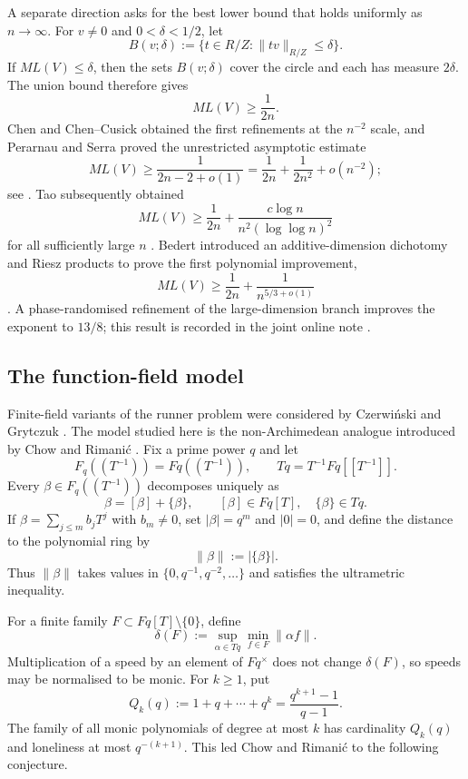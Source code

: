 \documentclass[11pt,reqno]{amsart}
\numberwithin{equation}{section}
\theoremstyle{definition}
\theoremstyle{remark}
\newcommand{\Fq}{\mathbb F_q}
\newcommand{\Kinf}{\mathbb F_q((T^{-1}))}
\newcommand{\Torus}{\mathbb T_q}
\newcommand{\cF}{\mathcal F}
\newcommand{\abs}[1]{\lvert#1\rvert}
\newcommand{\norm}[1]{\lVert#1\rVert}
\newcommand{\set}[1]{\{#1\}}
\def\Fq{Fq}%
\def\Torus{Tq}%
\def\mathbb#1{#1}%
\def\mathcal#1{#1}%
\def\operatorname#1{#1}%
\begin{document}
A separate direction asks for the best lower bound that holds uniformly as $n\to\infty$.  For $v\ne0$ and $0<\delta<1/2$, let
\[
 B(v;\delta):=\set{t\in\mathbb R/\mathbb Z:\norm{tv}_{\mathbb R/\mathbb Z}\le\delta}.
\]
If $\operatorname{ML}(V)\le\delta$, then the sets $B(v;\delta)$ cover the circle and each has measure $2\delta$.  The union bound therefore gives
\[
 \operatorname{ML}(V)\ge\frac1{2n}.
\]
Chen and Chen--Cusick obtained the first refinements at the $n^{-2}$ scale, and Perarnau and Serra proved the unrestricted asymptotic estimate
\[
 \operatorname{ML}(V)\ge\frac1{2n-2+o(1)}
 =\frac1{2n}+\frac1{2n^2}+o(n^{-2});
\]
see \cite{Chen,ChenCusick,PerarnauSerra}.  Tao subsequently obtained
\[
 \operatorname{ML}(V)
 \ge\frac1{2n}
 +\frac{c\log n}{n^2(\log\log n)^2}
\]
for all sufficiently large $n$ \cite{Tao}.  Bedert introduced an additive-dimension dichotomy and Riesz products to prove the first polynomial improvement,
\[
 \operatorname{ML}(V)
 \ge\frac1{2n}+\frac1{n^{5/3+o(1)}}
\]
\cite{Bedert}.  A phase-randomised refinement of the large-dimension branch improves the exponent to $13/8$; this result is recorded in the joint online note
\cite{BedertHu}.

\subsection{The function-field model}

Finite-field variants of the runner problem were considered by Czerwi\'nski and Grytczuk
\cite{CzerwinskiGrytczuk}.  The model studied here is the non-Archimedean analogue introduced by Chow and Rimani\'c
\cite{ChowRimanic}.  Fix a prime power $q$ and let
\[
 \Kinf=\Fq((T^{-1})),
 \qquad
 \Torus=T^{-1}\Fq[[T^{-1}]].
\]
Every $\beta\in\Kinf$ decomposes uniquely as
\[
 \beta=[\beta]+\{\beta\},
 \qquad
 [\beta]\in\Fq[T],
 \quad
 \{\beta\}\in\Torus.
\]
If $\beta=\sum_{j\le m}b_jT^j$ with $b_m\ne0$, set
$\abs\beta=q^m$ and $\abs0=0$, and define the distance to the polynomial ring by
\[
 \norm\beta:=\abs{\{\beta\}}.
\]
Thus $\norm\beta$ takes values in
$\set{0,q^{-1},q^{-2},\ldots}$ and satisfies the ultrametric inequality.

For a finite family
$\cF\subset\Fq[T]\setminus\set{0}$, define
\begin{equation}\label{eq:delta-def-intro}
 \delta(\cF)
 :=\sup_{\alpha\in\Torus}
   \min_{f\in\cF}\norm{\alpha f}.
\end{equation}
Multiplication of a speed by an element of $\Fq^\times$ does not change $\delta(\cF)$, so speeds may be normalised to be monic.  For $k\ge1$, put
\begin{equation}\label{eq:Qk-def-intro}
 Q_k(q):=1+q+\cdots+q^k
 =\frac{q^{k+1}-1}{q-1}.
\end{equation}
The family of all monic polynomials of degree at most $k$ has cardinality $Q_k(q)$ and loneliness at most $q^{-(k+1)}$.  This led Chow and Rimani\'c to the following conjecture.
\end{document}
